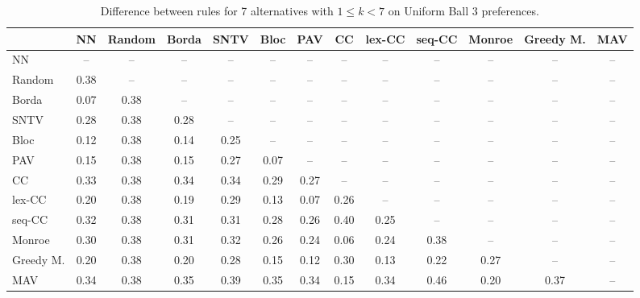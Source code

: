 
\begin{table*}[htbp]
\centering
\begin{tabular}{lcccccccccccc}
\toprule
 & NN & Random & Borda & SNTV & Bloc & PAV & CC & lex-CC & seq-CC & Monroe & Greedy M. & MAV \\
\midrule
NN & -- & -- & -- & -- & -- & -- & -- & -- & -- & -- & -- & -- \\
Random & \cellcolor{blue!38} 0.38 & -- & -- & -- & -- & -- & -- & -- & -- & -- & -- & -- \\
Borda & \cellcolor{blue!7} 0.07 & \cellcolor{blue!38} 0.38 & -- & -- & -- & -- & -- & -- & -- & -- & -- & -- \\
SNTV & \cellcolor{blue!28} 0.28 & \cellcolor{blue!38} 0.38 & \cellcolor{blue!28} 0.28 & -- & -- & -- & -- & -- & -- & -- & -- & -- \\
Bloc & \cellcolor{blue!12} 0.12 & \cellcolor{blue!38} 0.38 & \cellcolor{blue!14} 0.14 & \cellcolor{blue!25} 0.25 & -- & -- & -- & -- & -- & -- & -- & -- \\
PAV & \cellcolor{blue!15} 0.15 & \cellcolor{blue!38} 0.38 & \cellcolor{blue!15} 0.15 & \cellcolor{blue!27} 0.27 & \cellcolor{blue!7} 0.07 & -- & -- & -- & -- & -- & -- & -- \\
CC & \cellcolor{blue!33} 0.33 & \cellcolor{blue!38} 0.38 & \cellcolor{blue!34} 0.34 & \cellcolor{blue!34} 0.34 & \cellcolor{blue!28} 0.29 & \cellcolor{blue!27} 0.27 & -- & -- & -- & -- & -- & -- \\
lex-CC & \cellcolor{blue!20} 0.20 & \cellcolor{blue!38} 0.38 & \cellcolor{blue!19} 0.19 & \cellcolor{blue!28} 0.29 & \cellcolor{blue!13} 0.13 & \cellcolor{blue!7} 0.07 & \cellcolor{blue!26} 0.26 & -- & -- & -- & -- & -- \\
seq-CC & \cellcolor{blue!32} 0.32 & \cellcolor{blue!38} 0.38 & \cellcolor{blue!31} 0.31 & \cellcolor{blue!31} 0.31 & \cellcolor{blue!28} 0.28 & \cellcolor{blue!26} 0.26 & \cellcolor{blue!40} 0.40 & \cellcolor{blue!25} 0.25 & -- & -- & -- & -- \\
Monroe & \cellcolor{blue!30} 0.30 & \cellcolor{blue!38} 0.38 & \cellcolor{blue!31} 0.31 & \cellcolor{blue!32} 0.32 & \cellcolor{blue!26} 0.26 & \cellcolor{blue!24} 0.24 & \cellcolor{blue!6} 0.06 & \cellcolor{blue!24} 0.24 & \cellcolor{blue!38} 0.38 & -- & -- & -- \\
Greedy M. & \cellcolor{blue!20} 0.20 & \cellcolor{blue!38} 0.38 & \cellcolor{blue!20} 0.20 & \cellcolor{blue!28} 0.28 & \cellcolor{blue!15} 0.15 & \cellcolor{blue!12} 0.12 & \cellcolor{blue!30} 0.30 & \cellcolor{blue!13} 0.13 & \cellcolor{blue!22} 0.22 & \cellcolor{blue!27} 0.27 & -- & -- \\
MAV & \cellcolor{blue!34} 0.34 & \cellcolor{blue!38} 0.38 & \cellcolor{blue!35} 0.35 & \cellcolor{blue!39} 0.39 & \cellcolor{blue!35} 0.35 & \cellcolor{blue!34} 0.34 & \cellcolor{blue!15} 0.15 & \cellcolor{blue!34} 0.34 & \cellcolor{blue!46} 0.46 & \cellcolor{blue!20} 0.20 & \cellcolor{blue!37} 0.37 & -- \\
\bottomrule
\end{tabular}

\caption{Difference between rules for 7 alternatives with $1 \leq k < 7$ on Uniform Ball 3 preferences.}
\label{tab:rule_distance_heatmap-m=[7]-pref_dist=euclidean__args__dimensions=3_-_space=uniform_ball}
\end{table*}
    